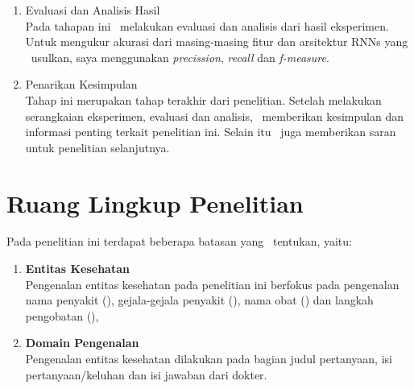 \begin{enumerate}
	\item Evaluasi dan Analisis Hasil \\
	Pada tahapan ini \saya~melakukan evaluasi dan analisis dari hasil eksperimen. Untuk mengukur akurasi dari masing-masing fitur dan arsitektur RNNs yang \saya~usulkan, saya menggunakan \textit{precission}, \textit{recall} dan \textit{f-measure}.
		
	\item Penarikan Kesimpulan \\
	Tahap ini merupakan tahap terakhir dari penelitian. Setelah melakukan serangkaian eksperimen, evaluasi dan analisis, \saya~memberikan kesimpulan dan informasi penting terkait penelitian ini. Selain itu \saya~juga memberikan saran untuk penelitian selanjutnya.
\end{enumerate}

\section{Ruang Lingkup Penelitian}
Pada penelitian ini terdapat beberapa batasan yang \saya~tentukan, yaitu:
\begin{enumerate}
\item{\bf Entitas Kesehatan}\\
Pengenalan entitas kesehatan pada penelitian ini berfokus pada pengenalan nama penyakit (\disease), gejala-gejala penyakit (\symptom), nama obat (\drug) dan langkah pengobatan (\treatment),

\item{\bf Domain Pengenalan}\\
Pengenalan entitas kesehatan dilakukan pada bagian judul pertanyaan, isi pertanyaan/keluhan dan isi jawaban dari dokter.
\end{enumerate}


